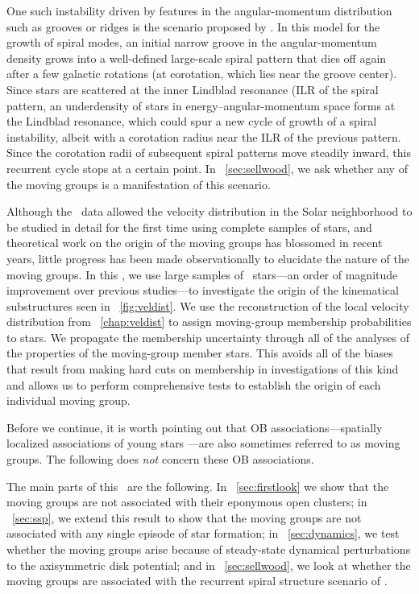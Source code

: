 One such instability driven by features in the angular-momentum
distribution such as grooves or ridges is the scenario proposed by
\citet{Sellwood91a} \citep[see also][]{Lovelace78a}. In this model for
the growth of spiral modes, an initial narrow groove in the
angular-momentum density grows into a well-defined large-scale spiral
pattern that dies off again after a few galactic rotations (at
corotation, which lies near the groove center). Since stars are
scattered at the inner Lindblad resonance (ILR of the spiral pattern,
an underdensity of stars in energy--angular-momentum space forms at
the Lindblad resonance, which could spur a new cycle of growth of a
spiral instability, albeit with a corotation radius near the ILR of
the previous pattern. Since the corotation radii of subsequent spiral
patterns move steadily inward, this recurrent cycle stops at a
certain point. In \sectionname~\ref{sec:sellwood}, we ask whether any
of the moving groups is a manifestation of this scenario.

Although the \Hipparcos\ data allowed the velocity distribution in the
Solar neighborhood to be studied in detail for the first time using
complete samples of stars, and theoretical work on the origin of the
moving groups has blossomed in recent years, little progress has been
made observationally to elucidate the nature of the moving groups. In
this \chaptername, we use large samples of \Hipparcos\ stars---an
order of magnitude improvement over previous studies---to investigate
the origin of the kinematical substructures seen in
\figurename~\ref{fig:veldist}. We use the reconstruction of the local
velocity distribution from \chaptername~\ref{chap:veldist} to assign
moving-group membership probabilities to stars. We propagate the
membership uncertainty through all of the analyses of the properties
of the moving-group member stars. This avoids all of the biases that
result from making hard cuts on membership in investigations of this
kind and allows us to perform comprehensive tests to establish the
origin of each individual moving group.

Before we continue, it is worth pointing out that OB
associations---spatially localized associations of young stars
\citep[\eg,][]{deZeeuw99a}---are also sometimes referred to as moving
groups. The following does \emph{not} concern these OB associations.

The main parts of this \chaptername\ are the following. In
\sectionname~\ref{sec:firstlook} we show that the moving groups are
not associated with their eponymous open clusters; in
\sectionname~\ref{sec:ssp}, we extend this result to show that the
moving groups are not associated with any single episode of star
formation; in \sectionname~\ref{sec:dynamics}, we test whether the
moving groups arise because of steady-state dynamical perturbations to
the axisymmetric disk potential; and in
\sectionname~\ref{sec:sellwood}, we look at whether the moving groups
are associated with the recurrent spiral structure scenario of
\citet{Sellwood91a}.


